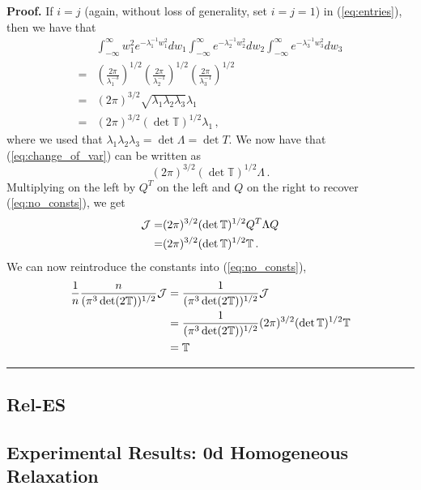 \documentclass[12pt]{CSUNthesis}
\def\T{\mathbb{T}}
\newenvironment{proof}[1][Proof]{\noindent\textbf{#1.} }{\newline \hspace*{\textwidth}\hspace*{-0,4cm} \rule{0.5em}{0.5em} \vspace{0,2cm}}
\def\T{\mathbb{T}}
\begin{document}
\begin{proof}
If $i=j$ (again, without loss of generality, set $i=j=1$) in (\ref{eq:entries}), then we have that
\begin{align}
&\int_{-\infty}^{\infty} w_1^2 e^{-\lambda_1^{-1}w_1^2} dw_1 \int_{-\infty}^{\infty} e^{-\lambda_2^{-1}w_2^2} dw_2 \int_{-\infty}^{\infty} e^{-\lambda_3^{-1}w_3^2} dw_3 \nonumber \\
= &\left(\frac{2{\pi}}{\lambda_1^{-3}} \right)^{1/2} \left(\frac{2{\pi}}{{\lambda_2^{-1}}} \right)^{1/2} \left(\frac{2{\pi}}{{\lambda_3^{-1}}} \right)^{1/2} \nonumber\\
= & (2 \pi)^{3/2} \sqrt{\lambda_1 \lambda_2 \lambda_3} \lambda_1 \nonumber\\
= & (2 \pi)^{3/2} (\det \T)^{1/2} \lambda_1 \, ,
\end{align}
where we used that $\lambda_1 \lambda_2 \lambda_3 = \det \Lambda = \det T$. We now have that (\ref{eq:change_of_var}) can be written as
\begin{equation}
(2 \pi)^{3/2} (\det \T)^{1/2} \Lambda \, .
\end{equation}
Multiplying on the left by $Q^T$ on the left and $Q$ on the right to recover (\ref{eq:no_consts}), we get
\begin{align}
\cal{J} = & (2 \pi)^{3/2} (\det \T)^{1/2} Q^T \Lambda Q \nonumber\\
= & (2 \pi)^{3/2} (\det \T)^{1/2} \T \, .
\end{align}
We can now reintroduce the constants into (\ref{eq:no_consts}),
\begin{align*}
\frac{1}{n} \frac{n}{(\pi^3 \det(2\T))^{1/2}} \cal{J} &= \frac{1}{(\pi^3 \det(2\T))^{1/2}} \cal{J}\\
&= \frac{1}{(\pi^3 \det(2\T))^{1/2}} (2 \pi)^{3/2} (\det \T)^{1/2} \T \\
&= \T
\end{align*}
\end{proof}

\subsection{Rel-ES}

\subsection{Experimental Results: 0d Homogeneous Relaxation}
\end{document}
